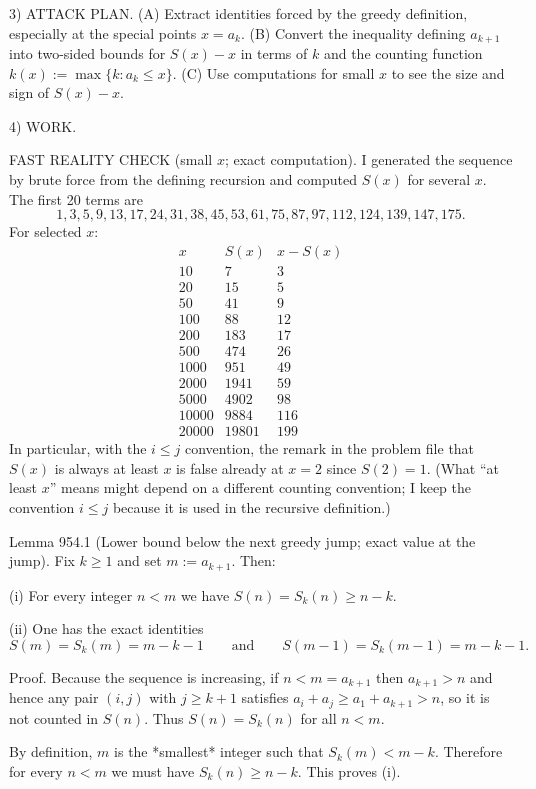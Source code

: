 3) ATTACK PLAN.
(A) Extract identities forced by the greedy definition, especially at the special points $x=a_k$.
(B) Convert the inequality defining $a_{k+1}$ into two-sided bounds for $S(x)-x$ in terms of $k$ and the counting function $k(x):=\max\{k: a_k\le x\}$.
(C) Use computations for small $x$ to see the size and sign of $S(x)-x$.

4) WORK.

FAST REALITY CHECK (small $x$; exact computation).
I generated the sequence by brute force from the defining recursion and computed $S(x)$ for several $x$.
The first 20 terms are
\[
1,3,5,9,13,17,24,31,38,45,53,61,75,87,97,112,124,139,147,175.
\]
For selected $x$:
\[
\begin{array}{c|c|c}
 x & S(x) & x-S(x)\\\hline
 10 & 7 & 3\\
 20 & 15 & 5\\
 50 & 41 & 9\\
 100 & 88 & 12\\
 200 & 183 & 17\\
 500 & 474 & 26\\
 1000 & 951 & 49\\
 2000 & 1941 & 59\\
 5000 & 4902 & 98\\
 10000 & 9884 & 116\\
 20000 & 19801 & 199
\end{array}
\]
In particular, with the $i\le j$ convention, the remark in the problem file that $S(x)$ is always at least $x$ is false already at $x=2$ since $S(2)=1$.
(What “at least $x$” means might depend on a different counting convention; I keep the convention $i\le j$ because it is used in the recursive definition.)

Lemma 954.1 (Lower bound below the next greedy jump; exact value at the jump).
Fix $k\ge 1$ and set $m:=a_{k+1}$. Then:

(i) For every integer $n<m$ we have $S(n)=S_k(n)\ge n-k$.

(ii) One has the exact identities
\[
S(m)=S_k(m)=m-k-1\qquad\text{and}\qquad S(m-1)=S_k(m-1)=m-k-1.
\]

Proof.
Because the sequence is increasing, if $n<m=a_{k+1}$ then $a_{k+1}>n$ and hence any pair $(i,j)$ with $j\ge k+1$ satisfies $a_i+a_j\ge a_1+a_{k+1}>n$, so it is not counted in $S(n)$. Thus $S(n)=S_k(n)$ for all $n<m$.

By definition, $m$ is the *smallest* integer such that $S_k(m)<m-k$. Therefore for every $n<m$ we must have $S_k(n)\ge n-k$. This proves (i).

